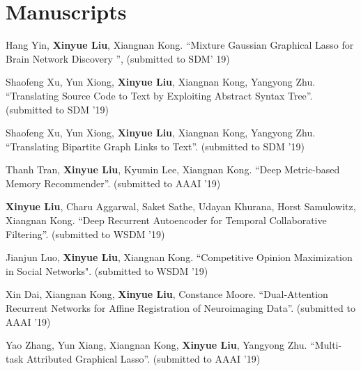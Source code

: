 \documentclass[a4paper,10pt]{article} %
\begin{document}
    \section{Manuscripts}
    \begin{enumerate}[label=(M\arabic*)., resume]
        {\item \label{MGGL}
        Hang Yin, \textbf{{Xinyue Liu}}, Xiangnan Kong. 
        ``Mixture Gaussian Graphical Lasso for Brain Network Discovery '', 
        (submitted to SDM' 19)
        }
    
        {\item 
         \label{tree2text}
         Shaofeng Xu, Yun Xiong, \textbf{{Xinyue Liu}}, Xiangnan Kong, Yangyong Zhu.
         ``Translating Source Code to Text by Exploiting
         Abstract Syntax Tree''. (submitted to SDM '19)
         }
    
        {\item 
         \label{net2text}
         Shaofeng Xu, Yun Xiong, \textbf{{Xinyue Liu}}, Xiangnan Kong, Yangyong Zhu.
         ``Translating Bipartite Graph Links to Text''. (submitted to SDM '19)
         }
    
         {\item \label{mmr}
         Thanh Tran, \textbf{{Xinyue Liu}}, Kyumin Lee, Xiangnan Kong. 
         ``Deep Metric-based Memory Recommender''. 
         (submitted to AAAI '19)
         }
    
         {\item \label{rAE}
         \textbf{{Xinyue Liu}}, Charu Aggarwal, Saket Sathe, Udayan Khurana, Horst Samulowitz, Xiangnan Kong. 
         ``Deep Recurrent Autoencoder for Temporal Collaborative Filtering''.
         (submitted to WSDM '19)
         }
         
        {\item \label{COM} 
        Jianjun Luo, \textbf{{Xinyue Liu}}, Xiangnan Kong. 
        ``Competitive Opinion Maximization in Social Networks". 
        (submitted to WSDM '19)
        }
    
        {\item \label{DROM}
        Xin Dai, Xiangnan Kong, \textbf{{Xinyue Liu}}, Constance Moore. 
        ``Dual-Attention Recurrent Networks for Affine Registration of Neuroimaging Data''. 
        (submitted to AAAI '19)
        }
    
        {\item \label{MAGL}
        Yao Zhang, Yun Xiang, Xiangnan Kong, \textbf{{Xinyue Liu}}, Yangyong Zhu. 
        ``Multi-task Attributed Graphical Lasso''.
        (submitted to AAAI '19) 
        }
    \end{enumerate}
    
\end{document}
